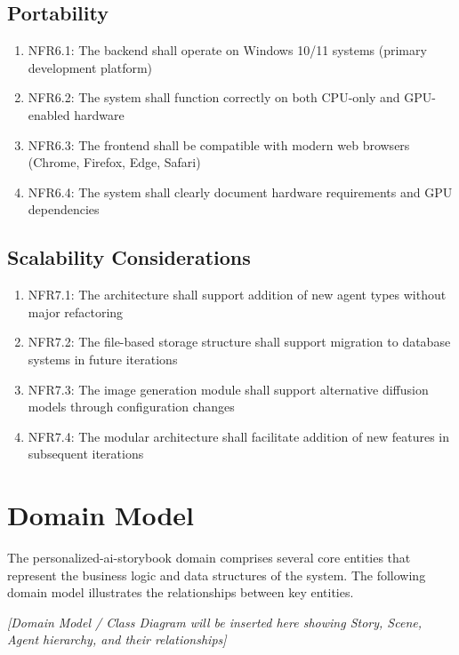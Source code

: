 \subsection{Portability}
\begin{enumerate}
    \item NFR6.1: The backend shall operate on Windows 10/11 systems (primary development platform)
    \item NFR6.2: The system shall function correctly on both CPU-only and GPU-enabled hardware
    \item NFR6.3: The frontend shall be compatible with modern web browsers (Chrome, Firefox, Edge, Safari)
    \item NFR6.4: The system shall clearly document hardware requirements and GPU dependencies
\end{enumerate}

\subsection{Scalability Considerations}
\begin{enumerate}
    \item NFR7.1: The architecture shall support addition of new agent types without major refactoring
    \item NFR7.2: The file-based storage structure shall support migration to database systems in future iterations
    \item NFR7.3: The image generation module shall support alternative diffusion models through configuration changes
    \item NFR7.4: The modular architecture shall facilitate addition of new features in subsequent iterations
\end{enumerate}

\section{Domain Model}
The personalized-ai-storybook domain comprises several core entities that represent the business logic and data structures of the system. The following domain model illustrates the relationships between key entities.

\vspace{3cm}
\begin{center}
\textit{[Domain Model / Class Diagram will be inserted here showing Story, Scene, Agent hierarchy, and their relationships]}
\end{center}
\vspace{3cm}

